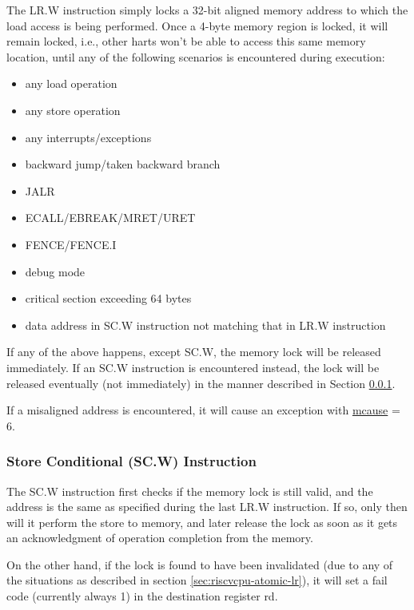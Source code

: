 \documentclass[main\_\_EN.tex]{subfiles}
\begin{document}
The LR.W instruction simply locks a 32-bit aligned memory address to which the load access is being performed. Once a 4-byte memory region is locked, it will remain locked, i.e., other harts won't be able to access this same memory location, until any of the following scenarios is encountered during execution:

\begin{itemize}
    \item any load operation
    \item any store operation
    \item any interrupts/exceptions
    \item backward jump/taken backward branch
    \item JALR
    \item ECALL/EBREAK/MRET/URET
    \item FENCE/FENCE.I
    \item debug mode
    \item critical section exceeding 64 bytes
    \item data address in SC.W instruction not matching that in LR.W instruction
\end{itemize}

If any of the above happens, except SC.W, the memory lock will be released immediately. If an SC.W instruction is encountered instead, the lock will be released eventually (not immediately) in the manner described in Section \ref{sec:riscvcpu-atomic-sc}.

If a misaligned address is encountered, it will cause an exception with \hyperref[regdesc:MCAUSE]{mcause} = 6.

\subsubsection{Store Conditional (SC.W) Instruction}
\label{sec:riscvcpu-atomic-sc}

The SC.W instruction first checks if the memory lock is still valid, and the address is the same as specified during the last LR.W instruction. If so, only then will it perform the store to memory, and later release the lock as soon as it gets an acknowledgment of operation completion from the memory.

On the other hand, if the lock is found to have been invalidated (due to any of the situations as described in section \ref{sec:riscvcpu-atomic-lr}), it will set a fail code (currently always 1) in the destination register rd.
\end{document}
